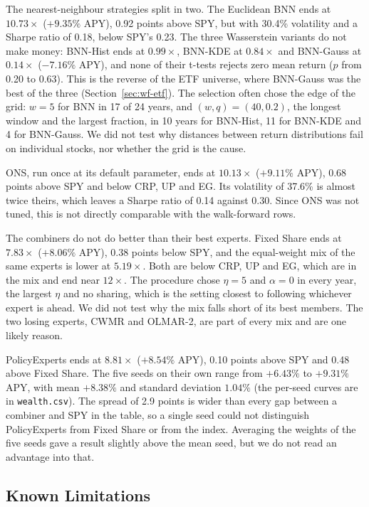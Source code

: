 \documentclass[11pt]{article}
\begin{document}
The nearest-neighbour strategies split in two. The Euclidean BNN ends at
$10.73\times$ ($+9.35\%$ APY), 0.92 points above SPY, but with 30.4\%
volatility and a Sharpe ratio of 0.18, below SPY's 0.23. The three
Wasserstein variants do not make money: BNN-Hist ends at $0.99\times$,
BNN-KDE at $0.84\times$ and BNN-Gauss at $0.14\times$ ($-7.16\%$ APY), and
none of their t-tests rejects zero mean return ($p$ from 0.20 to 0.63).
This is the reverse of the ETF universe, where BNN-Gauss was the best of
the three (Section~\ref{sec:wf-etf}). The selection often chose the edge of
the grid: $w=5$ for BNN in 17 of 24 years, and $(w,q)=(40,0.2)$, the longest
window and the largest fraction, in 10 years for BNN-Hist, 11 for BNN-KDE and
4 for BNN-Gauss. We did not test why distances between return distributions
fail on individual stocks, nor whether the grid is the cause.

ONS, run once at its default parameter, ends at $10.13\times$ ($+9.11\%$
APY), 0.68 points above SPY and below CRP, UP and EG. Its volatility of
37.6\% is almost twice theirs, which leaves a Sharpe ratio of 0.14 against
0.30. Since ONS was not tuned, this is not directly comparable with the
walk-forward rows.

The combiners do not do better than their best experts. Fixed Share ends
at $7.83\times$ ($+8.06\%$ APY), 0.38 points below SPY, and the
equal-weight mix of the same experts is lower at $5.19\times$. Both are
below CRP, UP and EG, which are in the mix and end near $12\times$. The
procedure chose $\eta=5$ and $\alpha=0$ in every year, the largest $\eta$
and no sharing, which is the setting closest to following whichever expert
is ahead. We did not test why the mix falls short of its best members. The
two losing experts, CWMR and OLMAR-2, are part of every mix and are one
likely reason.

PolicyExperts ends at $8.81\times$ ($+8.54\%$ APY), 0.10 points above SPY
and 0.48 above Fixed Share. The five seeds on their own range from
$+6.43\%$ to $+9.31\%$ APY, with mean $+8.38\%$ and standard deviation
$1.04\%$ (the per-seed curves are in \texttt{wealth.csv}). The spread
of 2.9 points is wider than every gap between a combiner and SPY in the
table, so a single seed could not distinguish PolicyExperts from Fixed
Share or from the index. Averaging the weights of the five seeds gave a result slightly
above the mean seed, but we do not read an advantage into that.

\subsection{Known Limitations}
\label{sec:limitations}
\end{document}
